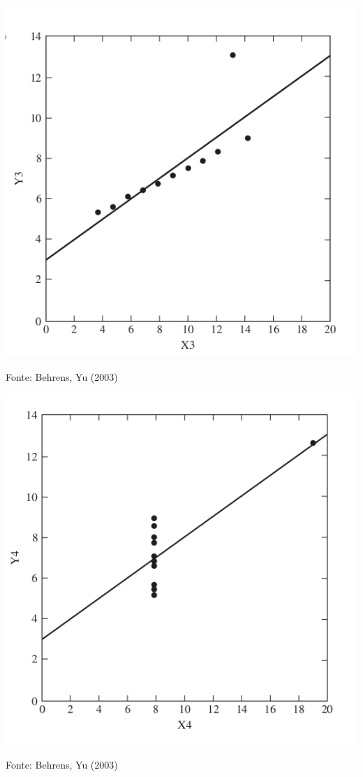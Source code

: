 \documentclass{beamer}
\begin{document}
\begin{frame}
  \begin{center}
    \includegraphics[height=0.7\textheight]{EDA/eda-dispersao3}
  \end{center}
  Fonte: Behrens, Yu (2003)
\end{frame}

\begin{frame}
  \begin{center}
    \includegraphics[height=0.7\textheight]{EDA/eda-dispersao4}
  \end{center}
  Fonte: Behrens, Yu (2003)
\end{frame}
\end{document}
